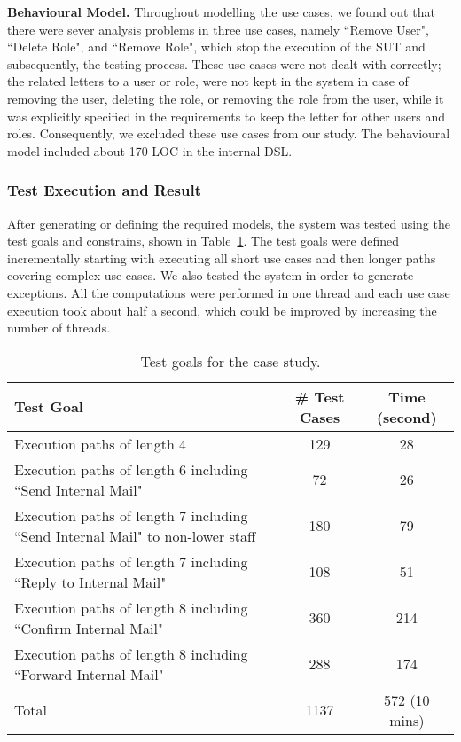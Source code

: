\textbf{Behavioural Model.} \label{sec:case-study-behaviour} Throughout modelling the use cases, we found out that there were sever analysis problems in three use cases, namely ``Remove User", ``Delete Role", and ``Remove Role", which stop the execution of the SUT and subsequently, the testing process. These use cases were not dealt with correctly; the related letters to a user or role, were not kept in the system in case of removing the user, deleting the role, or removing the role from the user, while it was explicitly specified in the requirements to keep the letter for other users and roles.
Consequently, we excluded these use cases from our study. The behavioural model included about 170 LOC in the internal DSL.  

\subsubsection{Test Execution and Result}
\label{sec:case-study-result}
After generating or defining the required models, the system was tested using the test goals and constrains, shown in Table~\ref{tbl:case-study-goals}. The test goals were defined incrementally starting with executing all short use cases and then longer paths covering complex use cases. We also tested the system in order to generate exceptions. All the computations were performed in one thread and each use case execution took about half a second, which could be improved by increasing the number of threads.	

\begin{table}[!t]
\caption{Test goals for the case study.}
\label{tbl:case-study-goals}
\centering
\begin{tabular}{|p{4cm}|c|c|}
\hline
Test Goal & \# Test Cases & Time (second)  \\ \hline
Execution paths of length 4 & 129 & 28 \\  \hline
Execution paths of length 6 including ``Send Internal Mail" & 72 & 26 \\ \hline
Execution paths of length 7 including ``Send Internal Mail" to non-lower staff & 180 & 79 \\ \hline
Execution paths of length 7 including ``Reply to Internal Mail" & 108 & 51 \\ \hline
Execution paths of length 8 including ``Confirm Internal Mail" & 360 & 214 \\ \hline
Execution paths of length 8 including ``Forward Internal Mail" & 288 & 174 \\ \hline\hline
Total & 1137 & 572 (10 mins) \\
\hline
\end{tabular}
\end{table}

